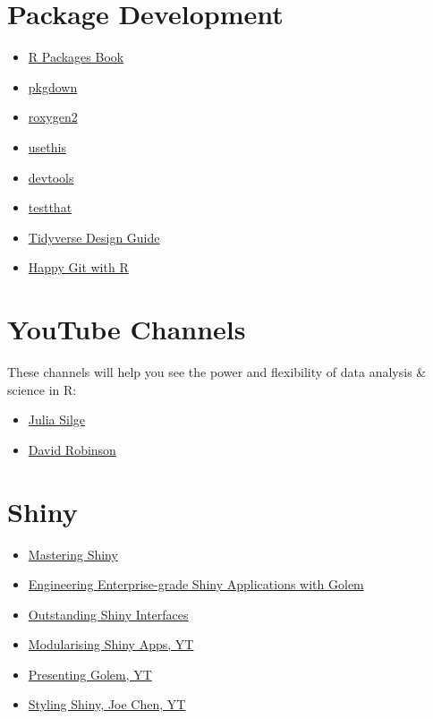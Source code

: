 \documentclass[
  letterpaper,
  DIV=11,
  numbers=noendperiod]{scrreprt}
\providecommand{\tightlist}{%
  \setlength{\itemsep}{0pt}\setlength{\parskip}{0pt}}\usepackage{longtable,booktabs,array}
\begin{document}
\section{Package Development}\label{package-development-1}

\begin{itemize}
\tightlist
\item
  \href{https://r-pkgs.org/}{R Packages Book}
\item
  \href{https://pkgdown.r-lib.org/}{pkgdown}
\item
  \href{https://roxygen2.r-lib.org/}{roxygen2}
\item
  \href{https://usethis.r-lib.org/}{usethis}
\item
  \href{https://devtools.r-lib.org/}{devtools}
\item
  \href{https://testthat.r-lib.org/}{testthat}
\item
  \href{https://design.tidyverse.org/}{Tidyverse Design Guide}
\item
  \href{https://happygitwithr.com/}{Happy Git with R}
\end{itemize}

\section{YouTube Channels}\label{youtube-channels}

These channels will help you see the power and flexibility of data
analysis \& science in R:

\begin{itemize}
\tightlist
\item
  \href{https://www.youtube.com/@JuliaSilge}{Julia Silge}
\item
  \href{https://www.youtube.com/user/safe4democracy/videos}{David
  Robinson}
\end{itemize}

\section{Shiny}\label{shiny}

\begin{itemize}
\tightlist
\item
  \href{https://mastering-shiny.org/}{Mastering Shiny}
\item
  \href{https://engineering-shiny.org/foreword.html}{Engineering
  Enterprise-grade Shiny Applications with Golem}
\item
  \href{https://unleash-shiny.rinterface.com/}{Outstanding Shiny
  Interfaces}
\item
  \href{https://www.youtube.com/watch?v=oOYaHsPXLvs}{Modularising Shiny
  Apps, YT}
\item
  \href{https://www.youtube.com/watch?v=SE6TnUV4nC4&ab_channel=PositPBC}{Presenting
  Golem, YT}
\item
  \href{https://www.youtube.com/watch?v=GHBwprI_Py4}{Styling Shiny, Joe
  Chen, YT}
\end{itemize}
\end{document}
